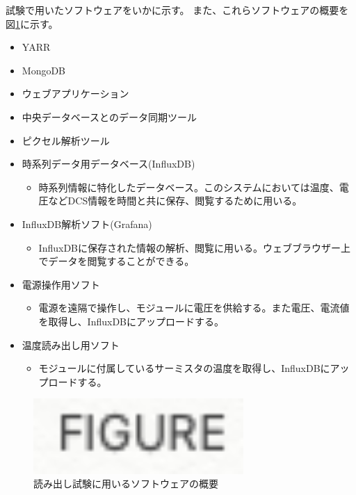 試験で用いたソフトウェアをいかに示す。
また、これらソフトウェアの概要を図\ref{readout_SW_overview}に示す。
\begin{itemize}
  \item YARR
  \item MongoDB
  \item ウェブアプリケーション
  \item 中央データベースとのデータ同期ツール
  \item ピクセル解析ツール
  \item 時系列データ用データベース(InfluxDB)
    \begin{itemize}
      \item 時系列情報に特化したデータベース。このシステムにおいては温度、電圧などDCS情報を時間と共に保存、閲覧するために用いる。
    \end{itemize}
  \item InfluxDB解析ソフト(Grafana)
    \begin{itemize}
      \item InfluxDBに保存された情報の解析、閲覧に用いる。ウェブブラウザー上でデータを閲覧することができる。
    \end{itemize}
  \item 電源操作用ソフト
    \begin{itemize}
      \item 電源を遠隔で操作し、モジュールに電圧を供給する。また電圧、電流値を取得し、InfluxDBにアップロードする。
    \end{itemize}
  \item 温度読み出し用ソフト
    \begin{itemize}
      \item モジュールに付属しているサーミスタの温度を取得し、InfluxDBにアップロードする。
    \end{itemize}
\end{itemize}

\begin{figure}[bpt]\centering
\includegraphics[width=8cm]{figure}
\caption[読み出し試験に用いるソフトウェアの概要]{読み出し試験に用いるソフトウェアの概要}
\label{readout_SW_overview}
\end{figure}

